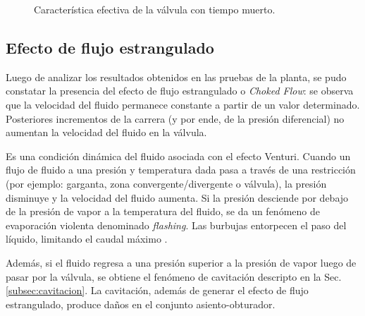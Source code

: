 \begin{figure}[ht]
  \centering
\caption{Característica efectiva de la válvula con tiempo muerto.}
\label{fig:valvulaCtiempoMuerto}
\end{figure}

\subsection{Efecto de flujo estrangulado}
\label{subsec:chokedflow}

Luego de analizar los resultados obtenidos en las pruebas de la planta, se pudo
constatar la presencia del efecto de flujo estrangulado o \emph{Choked
Flow}: se observa que la velocidad del fluido permanece constante a partir de
un valor determinado.
Posteriores incrementos de la carrera (y por ende, de la presión diferencial) no
aumentan la velocidad del fluido en la válvula.

Es una condición dinámica del fluido asociada con el efecto Venturi.
Cuando un flujo de fluido a una presión y temperatura dada pasa a través de una
restricción (por ejemplo: garganta, zona convergente/divergente o válvula),
la presión disminuye y la velocidad del fluido aumenta.
Si la presión desciende por debajo de la presión de vapor a la
temperatura del fluido, se da un fenómeno de evaporación violenta denominado
\emph{flashing}.
Las burbujas entorpecen el paso del líquido, limitando el caudal máximo
\cite{bib:controlValveHandbook,bib:ApuntesPuglesiValvulas}.

Además, si el fluido regresa a una presión superior a la presión de vapor luego
de pasar por la válvula, se obtiene el fenómeno de cavitación descripto en la
Sec. \ref{subsec:cavitacion}.
La cavitación, además de generar el efecto de flujo estrangulado, produce daños
en el conjunto asiento-obturador.

